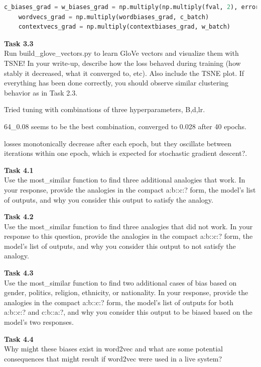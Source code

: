 \documentclass[12pt,article]{article}
\newenvironment{task}[2][Task]
    { \begin{mdframed}[backgroundcolor=gray!20] \textbf{#1 #2} \\}
    {  \end{mdframed}}
\begin{document}
\small{
\begin{lstlisting}[language=Python]
    c_biases_grad = w_biases_grad = np.multiply(np.multiply(fval, 2), error)
    wordvecs_grad = np.multiply(wordbiases_grad, c_batch)
    contextvecs_grad = np.multiply(contextbiases_grad, w_batch)
\end{lstlisting}
}

\begin{task}{3.3} 
Run build\_glove\_vectors.py to learn GloVe vectors and visualize them with TSNE! In your write-up, describe how the loss behaved during training (how stably it decreased, what it converged to, etc). Also include the TSNE plot. If everything has been done correctly, you should observe similar clustering behavior as in Task 2.3.
\end{task}

Tried tuning with combinations of three hyperparameters, B,d,lr. 

64\_0.08 seems to be the best combination, converged to 0.028 after 40 epochs. 

losses monotonically decrease after each epoch, but they oscillate between iterations within one epoch, which is expected for stochastic gradient descent?.
\newpage
\begin{task}{4.1} 
Use the most\_similar function to find three additional analogies that work. In your response, provide the analogies in the compact a:b::c:? form, the model's list of outputs, and why you consider this output to satisfy the analogy.
\end{task}

\begin{task}{4.2} 
Use the most\_similar function to find three analogies that did not work. In your response to this question, provide the analogies in the compact a:b::c:? form, the model's list of outputs, and why you consider this output to not satisfy the analogy.
\end{task}

\begin{task}{4.3} 
Use the most\_similar function to find two additional cases of bias based on gender, politics, religion, ethnicity, or nationality. In your response, provide the analogies in the compact a:b::c:? form, the model's list of outputs for both a:b::c:? and c:b::a:?, and why you consider this output to be biased based on the model's two responses.
\end{task}

\begin{task}{4.4} 
Why might these biases exist in word2vec and what are some potential consequences that might result if word2vec were used in a live system?
\end{task}



\end{document}
